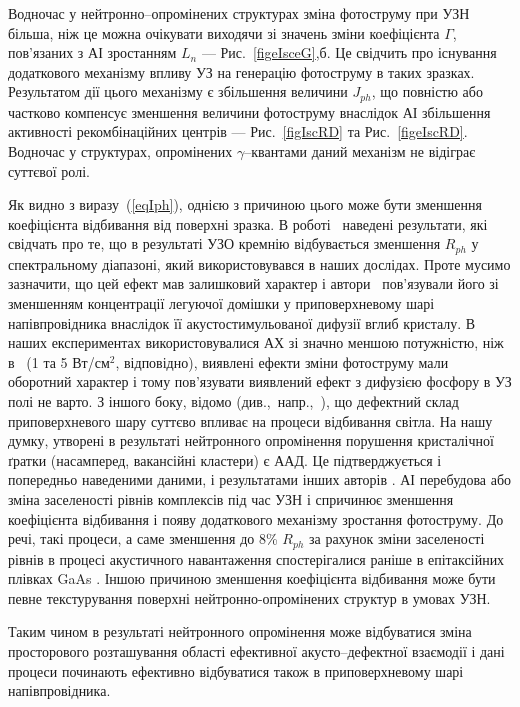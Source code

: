 Водночас у нейтронно--опромінених структурах зміна фотоструму при УЗН більша,
ніж це можна очікувати виходячи зі значень зміни коефіцієнта $\Gamma$, пов’язаних з АІ зростанням $L_n$ --- Рис.~\ref{figeIsceG},б.
Це свідчить про існування додаткового механізму впливу УЗ на генерацію фотоструму в таких зразках.
Результатом дії цього механізму є збільшення величини $J_{ph}$, що повністю або частково компенсує
зменшення величини фотоструму внаслідок АІ збільшення активності рекомбінаційних центрів --- Рис.~\ref{figIscRD} та Рис.~\ref{figeIscRD}.
Водночас у структурах, опромінених $\gamma$--квантами даний механізм не відіграє суттєвої ролі.


Як видно з виразу~(\ref{eqIph}), однією з причиною цього може бути зменшення коефіцієнта відбивання від поверхні зразка.
В роботі~\cite{Zaver} наведені результати, які свідчать про те, що в результаті УЗО кремнію відбувається
зменшення $R_{ph}$ у спектральному
діапазоні, який використовувався в наших дослідах.
Проте мусимо зазначити, що цей ефект мав залишковий характер і
автори~\cite{Zaver} пов’язували його зі зменшенням концентрації
легуючої домішки у приповерхневому шарі напівпровідника внаслідок
її акустостимульованої дифузії вглиб кристалу.
В наших експериментах використовувалися АХ зі значно меншою потужністю, ніж
в~\cite{Zaver} (1 та 5 Вт/см$^2$, відповідно),  виявлені ефекти зміни фотоструму мали оборотний характер
і тому пов'язувати виявлений ефект з дифузією фосфору в УЗ полі не варто.
З іншого боку, відомо (див.,~напр.,~\cite{Kizel}), що дефектний склад
приповерхневого шару суттєво впливає на процеси відбивання світла.
На нашу думку, утворені в результаті нейтронного опромінення порушення кристалічної ґратки
(насамперед, вакансійні кластери) є ААД.
Це підтверджується і попередньо наведеними даними, і результатами інших авторів \cite{YOlikh2006TPLr}.
АІ перебудова або зміна заселеності рівнів комплексів під час УЗН і спричинює зменшення коефіцієнта відбивання
і появу додаткового механізму зростання фотоструму.
До речі, такі процеси, а саме зменшення до 8\% $R_{ph}$ за рахунок зміни заселеності рівнів в
процесі акустичного навантаження спостерігалися раніше в
епітаксійних плівках GaAs \cite{Korotch}.
Іншою причиною зменшення
коефіцієнта відбивання може бути певне текстурування поверхні нейтронно-опромінених
структур в умовах УЗН.

Таким чином в результаті нейтронного опромінення може відбуватися
зміна просторового розташування області ефективної акусто--дефектної
взаємодії і дані процеси починають ефективно відбуватися також в
приповерхневому шарі напівпровідника.



